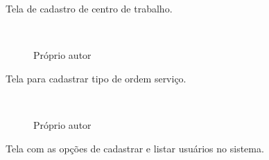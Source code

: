 Tela de cadastro de centro de trabalho.

\begin{figure}[H]
		\caption{\label{Cadastro_Centro_Trabalho}Próprio autor}
	\centering
	\mbox{%
		\qquad
	}
	
\end{figure}
\newpage

Tela para cadastrar tipo de ordem serviço.

\begin{figure}[H]
		\caption{\label{Cadastro_Tipo_Ordem}Próprio autor}
	\centering
	\mbox{%
		\qquad
	}
	
\end{figure}
\newpage


Tela com as opções de cadastrar e listar usuários no sistema.

